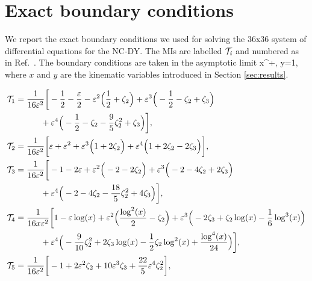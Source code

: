 \section{Exact boundary conditions}
\label{app:exactbcs}
We report the exact boundary conditions we used for solving the 36x36 system of differential equations for the NC-DY. The MIs are labelled $\mathcal{T}_i$ and numbered as in Ref.~\cite{Bonciani:2016ypc}. The boundary conditions are taken in the asymptotic limit 
\be
x^+\;, \qquad y=1,
\ee
where $x$ and $y$ are the kinematic variables introduced in Section \ref{sec:results}. 
\vspace*{3mm}


\vspace*{3mm}

\begingroup
\allowdisplaybreaks
\begin{align}
% 
\mi_1 &=   \frac{1}{16 \ep^2}  \bigg[
% 
-\frac{1}{2}
-\frac{\ep}{2}
-\ep^2 \Big(
         \frac{1}{2}
        +\zeta_2
\Big)
+\ep^3 \Big(
        -\frac{1}{2}
        -\zeta_2
        +\zeta_3
\Big)
\nonumber\\& \qquad \quad
+\ep^4 \Big(
        -\frac{1}{2}
        -\zeta_2
        -\frac{9}{5} \zeta_2^2
        +\zeta_3
\Big)
% 
\bigg],
\nonumber\\
%
\mi_2 &=   \frac{1}{16 \ep^2}  \bigg[
% 
\ep
+\ep^2
+\ep^3 \Big(
        1
        +2 \zeta_2
\Big)
+\ep^4 \Big(
        1
        +2 \zeta_2
        -2 \zeta_3
\Big)
% 
\bigg],
% 
\nonumber\\
% 
\mi_3 &=   \frac{1}{16 \ep^2}  \bigg[
% 
-1
-2 \ep
+\ep^2 \Big(
        -2
        -2 \zeta_2
\Big)
+\ep^3 \Big(
        -2
        -4 \zeta_2
        +2 \zeta_3
\Big)
\nonumber\\& \qquad \quad
+\ep^4 \Big(
        -2
        -4 \zeta_2
        -\frac{18}{5} \zeta_2^2
        +4 \zeta_3
\Big)
% 
\bigg],
% 
\nonumber\\
% 
\mi_4 &=   \frac{1}{16 x \ep^2}  \bigg[
% 
1
-\ep \log (x)
+\ep^2 \Big(
        \frac{\log ^2(x)}{2}
        -\zeta_2
\Big)
+\ep^3 \Big(
        -2 \zeta_3
        +\zeta_2 \log (x)
        -\frac{1}{6} \log ^3(x)
\Big)
\nonumber\\& \qquad \quad
+\ep^4 \Big(
        -\frac{9}{10} \zeta_2^2
        +2 \zeta_3 \log (x)
        -\frac{1}{2} \zeta_2 \log ^2(x)
        +\frac{\log ^4(x)}{24}
\Big)
% 
\bigg],
% 
\nonumber\\
%
\mi_5 &=   \frac{1}{16 \ep^2}  \bigg[
% 
-1
+2 \ep^2 \zeta_2
+10 \ep^3 \zeta_3
+\frac{22}{5} \ep^4 \zeta_2^2
% 
\bigg],
% 
\nonumber\\

\end{align}
